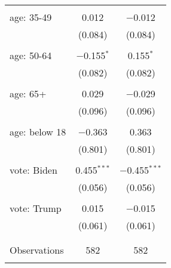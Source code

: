 \begin{tabular}{@{\extracolsep{5pt}}lcc}
  & & \\ 
 age: 35-49 & 0.012 & $-$0.012 \\ 
  & (0.084) & (0.084) \\ 
  & & \\ 
 age: 50-64 & $-$0.155$^{*}$ & 0.155$^{*}$ \\ 
  & (0.082) & (0.082) \\ 
  & & \\ 
 age: 65+ & 0.029 & $-$0.029 \\ 
  & (0.096) & (0.096) \\ 
  & & \\ 
 age: below 18 & $-$0.363 & 0.363 \\ 
  & (0.801) & (0.801) \\ 
  & & \\ 
 vote: Biden & 0.455$^{***}$ & $-$0.455$^{***}$ \\ 
  & (0.056) & (0.056) \\ 
  & & \\ 
 vote: Trump & 0.015 & $-$0.015 \\ 
  & (0.061) & (0.061) \\ 
  & & \\ 
\hline \\[-1.8ex] 

Observations & 582 & 582 \\ 
\hline 
\hline \\[-1.8ex] 
\end{tabular} 